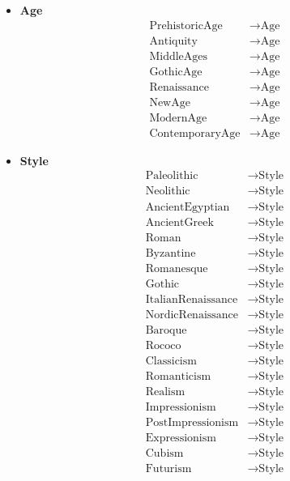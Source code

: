 \documentclass{article}
\begin{document}
\begin{itemize}
  \item \textbf{Age}
    \begin{align*}
      \text{PrehistoricAge} &\to \text{Age}\\
      \text{Antiquity} &\to \text{Age}\\
      \text{MiddleAges} &\to \text{Age}\\
      \text{GothicAge} &\to \text{Age}\\
      \text{Renaissance} &\to \text{Age}\\
      \text{NewAge} &\to \text{Age}\\
      \text{ModernAge} &\to \text{Age}\\
      \text{ContemporaryAge} &\to \text{Age}
    \end{align*}
  \item \textbf{Style}
    \begin{align*}
      \text{Paleolithic} &\to \text{Style}\\
      \text{Neolithic} &\to \text{Style}\\
      \text{AncientEgyptian} &\to \text{Style}\\
      \text{AncientGreek} &\to \text{Style}\\
      \text{Roman} &\to \text{Style}\\
      \text{Byzantine} &\to \text{Style}\\
      \text{Romanesque} &\to \text{Style}\\
      \text{Gothic} &\to \text{Style}\\
      \text{ItalianRenaissance} &\to \text{Style}\\
      \text{NordicRenaissance} &\to \text{Style}\\
      \text{Baroque} &\to \text{Style}\\
      \text{Rococo} &\to \text{Style}\\
      \text{Classicism} &\to \text{Style}\\
      \text{Romanticism} &\to \text{Style}\\
      \text{Realism} &\to \text{Style}\\
      \text{Impressionism} &\to \text{Style}\\
      \text{PostImpressionism} &\to \text{Style}\\
      \text{Expressionism} &\to \text{Style}\\
      \text{Cubism} &\to \text{Style}\\
      \text{Futurism} &\to \text{Style}\\

\end{align*}
\end{itemize}
\end{document}
